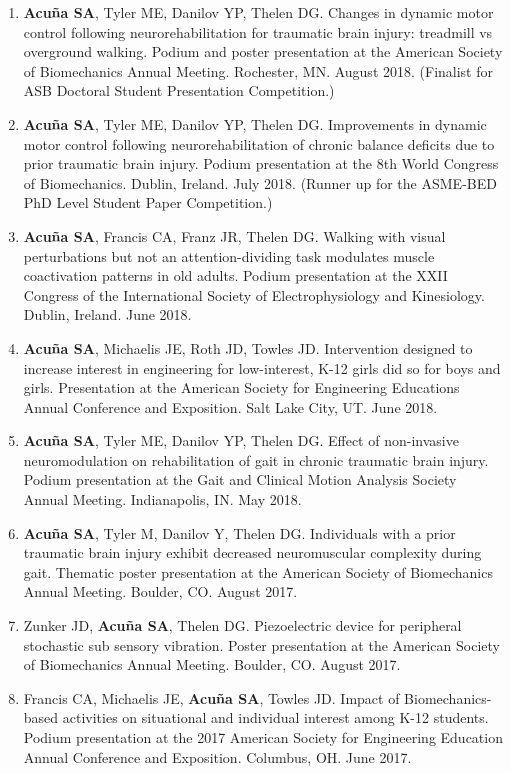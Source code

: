 \documentclass[letterpaper, 10pt]{article}
\begin{document}
\begin{enumerate}
    \item \textbf{Acuña SA}, Tyler ME, Danilov YP, Thelen DG. Changes in dynamic motor control following neurorehabilitation for traumatic brain injury: treadmill vs overground walking. Podium and poster presentation at the American Society of Biomechanics Annual Meeting. Rochester, MN. August 2018. (Finalist for ASB Doctoral Student Presentation Competition.)
    \item \textbf{Acuña SA}, Tyler ME, Danilov YP, Thelen DG. Improvements in dynamic motor control following neurorehabilitation of chronic balance deﬁcits due to prior traumatic brain injury. Podium presentation at the 8th World Congress of Biomechanics. Dublin, Ireland. July 2018. (Runner up for the ASME-BED PhD Level Student Paper Competition.)
    \item \textbf{Acuña SA}, Francis CA, Franz JR, Thelen DG. Walking with visual perturbations but not an attention-dividing task modulates muscle coactivation patterns in old adults. Podium presentation at the XXII Congress of the International Society of Electrophysiology and Kinesiology. Dublin, Ireland. June 2018.
    \item \textbf{Acuña SA}, Michaelis JE, Roth JD, Towles JD. Intervention designed to increase interest in engineering for low-interest, K-12 girls did so for boys and girls. Presentation at the American Society for Engineering Educations Annual Conference and Exposition. Salt Lake City, UT. June 2018.
    \item \textbf{Acuña SA}, Tyler ME, Danilov YP, Thelen DG. Effect of non-invasive neuromodulation on rehabilitation of gait in chronic traumatic brain injury. Podium presentation at the Gait and Clinical Motion Analysis Society Annual Meeting. Indianapolis, IN. May 2018.
    \item \textbf{Acuña SA}, Tyler M, Danilov Y, Thelen DG. Individuals with a prior traumatic brain injury exhibit decreased neuromuscular complexity during gait. Thematic poster presentation at the American Society of Biomechanics Annual Meeting. Boulder, CO. August 2017.
    \item Zunker JD, \textbf{Acuña SA}, Thelen DG. Piezoelectric device for peripheral stochastic sub sensory vibration. Poster presentation at the American Society of Biomechanics Annual Meeting. Boulder, CO. August 2017.
    \item Francis CA, Michaelis JE, \textbf{Acuña SA}, Towles JD. Impact of Biomechanics-based activities on situational and individual interest among K-12 students. Podium presentation at the 2017 American Society for Engineering Education Annual Conference and Exposition. Columbus, OH. June 2017.

\end{enumerate}
\end{document}
